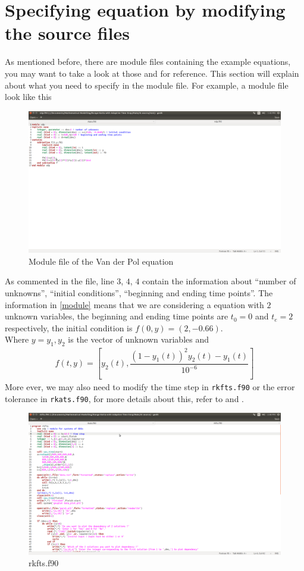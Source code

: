 \documentclass[a4paper,oneside]{book}
\numberwithin{equation}{chapter}
\begin{document}
	\section{Specifying equation by modifying the source files}
	As mentioned before, there are module files containing the example equations, you may want to take a look at those and \cite{user3} for reference. This section will explain about what you need to specify in the module file. For example, a module file look like this
	\begin{figure}[H]
		\centering	\includegraphics[width=15cm]{fig0}
		\caption{Module file of the Van der Pol equation}
		\label{module}
	\end{figure}
	\noindent As commented in the file, line $3$, $4$, $4$ contain the information about ``number of unknowns'', ``initial conditions'', ``beginning and ending time points''. The information in \autoref{module} means that we are considering a equation with $2$ unknown variables, the beginning and ending time points are $t_0=0$ and $t_e=2$ respectively, the initial condition is $f(0,y)=(2,-0.66)$.\\
	Where $y=y_1,y_2$ is the vector of unknown variables and 
	\begin{align}
		f\left(t,y\right)=\left[y_2(t) , \dfrac{\left(1-y_1(t)\right)^2y_2(t)-y_1(t)}{10^{-6}}\right]
	\end{align}
	\noindent More ever, we may also need to modify the time step in \texttt{rkfts.f90} or the error tolerance in \texttt{rkats.f90}, for more details about this, refer to \cite{user1} and \cite{user2}.
	\begin{figure}[H]
		\centering	\includegraphics[width=15cm]{fig01}
		\caption{rkfts.f90}
	\end{figure}
\end{document}
